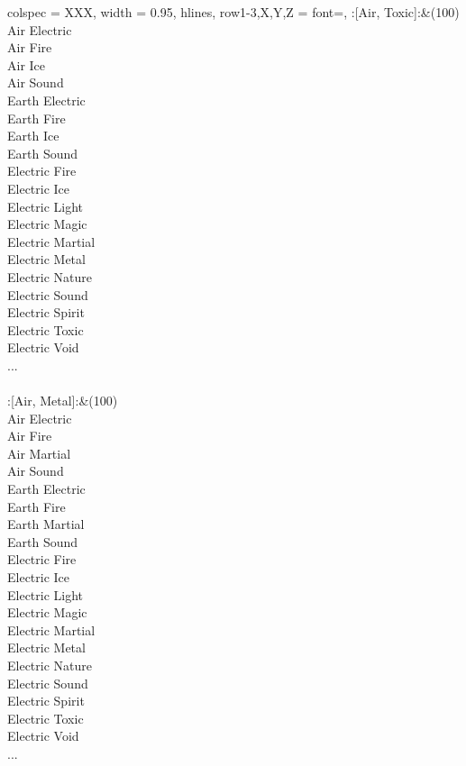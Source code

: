 \begin{longtblr}[
	caption = {2v2 Defending Weak},
	label = {2v2-Defending-Weak},
]{
	colspec = {XXX}, width = 0.95\linewidth,
	hlines,
	row{1-3,X,Y,Z} = {font=\bfseries},
}
	:[Air, Toxic]:&{(100)\\
	Air Electric \\
	Air Fire \\
	Air Ice \\
	Air Sound \\
	Earth Electric \\
	Earth Fire \\
	Earth Ice \\
	Earth Sound \\
	Electric Fire \\
	Electric Ice \\
	Electric Light \\
	Electric Magic \\
	Electric Martial \\
	Electric Metal \\
	Electric Nature \\
	Electric Sound \\
	Electric Spirit \\
	Electric Toxic \\
	Electric Void \\
	...\\
	}\\

	:[Air, Metal]:&{(100)\\
	Air Electric \\
	Air Fire \\
	Air Martial \\
	Air Sound \\
	Earth Electric \\
	Earth Fire \\
	Earth Martial \\
	Earth Sound \\
	Electric Fire \\
	Electric Ice \\
	Electric Light \\
	Electric Magic \\
	Electric Martial \\
	Electric Metal \\
	Electric Nature \\
	Electric Sound \\
	Electric Spirit \\
	Electric Toxic \\
	Electric Void \\
	...\\
	}\\


\end{longtblr}
